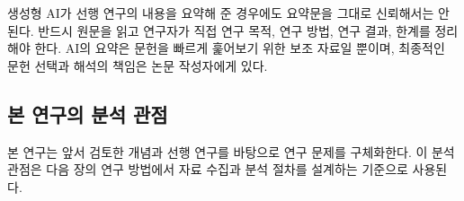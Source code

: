 생성형 AI가 선행 연구의 내용을 요약해 준 경우에도 요약문을 그대로 신뢰해서는 안 된다.
반드시 원문을 읽고 연구자가 직접 연구 목적, 연구 방법, 연구 결과, 한계를 정리해야 한다.
AI의 요약은 문헌을 빠르게 훑어보기 위한 보조 자료일 뿐이며, 최종적인 문헌 선택과 해석의 책임은 논문 작성자에게 있다.

\subsection{본 연구의 분석 관점}


본 연구는 앞서 검토한 개념과 선행 연구를 바탕으로 연구 문제를 구체화한다.
이 분석 관점은 다음 장의 연구 방법에서 자료 수집과 분석 절차를 설계하는 기준으로 사용된다.

